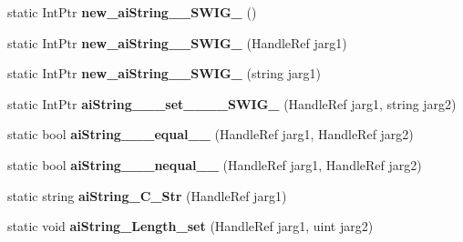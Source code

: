 \begin{DoxyCompactItemize}
\item 
\hypertarget{class_assimp_p_i_n_v_o_k_e_aaf47048d7ab228660b9896944cefd991}{static Int\+Ptr {\bfseries new\+\_\+ai\+String\+\_\+\+\_\+\+S\+W\+I\+G\+\_} ()}\label{class_assimp_p_i_n_v_o_k_e_aaf47048d7ab228660b9896944cefd991}

\item 
\hypertarget{class_assimp_p_i_n_v_o_k_e_a1bc609c6c57ff3c579df7ab551ebe539}{static Int\+Ptr {\bfseries new\+\_\+ai\+String\+\_\+\+\_\+\+S\+W\+I\+G\+\_} (Handle\+Ref jarg1)}\label{class_assimp_p_i_n_v_o_k_e_a1bc609c6c57ff3c579df7ab551ebe539}

\item 
\hypertarget{class_assimp_p_i_n_v_o_k_e_ae581f18f18d7af4663b7b8f8e7e3aa1d}{static Int\+Ptr {\bfseries new\+\_\+ai\+String\+\_\+\+\_\+\+S\+W\+I\+G\+\_} (string jarg1)}\label{class_assimp_p_i_n_v_o_k_e_ae581f18f18d7af4663b7b8f8e7e3aa1d}

\item 
\hypertarget{class_assimp_p_i_n_v_o_k_e_a064fca7198a4d0d456e51e63ef837e1a}{static Int\+Ptr {\bfseries ai\+String\+\_\+\+\_\+\+\_\+set\+\_\+\+\_\+\+\_\+\+\_\+\+S\+W\+I\+G\+\_} (Handle\+Ref jarg1, string jarg2)}\label{class_assimp_p_i_n_v_o_k_e_a064fca7198a4d0d456e51e63ef837e1a}

\item 
\hypertarget{class_assimp_p_i_n_v_o_k_e_a6b8aa2f7bba86767921c933182301877}{static bool {\bfseries ai\+String\+\_\+\+\_\+\+\_\+equal\+\_\+\+\_\+} (Handle\+Ref jarg1, Handle\+Ref jarg2)}\label{class_assimp_p_i_n_v_o_k_e_a6b8aa2f7bba86767921c933182301877}

\item 
\hypertarget{class_assimp_p_i_n_v_o_k_e_a6b71c239db4393f93a08557f294ef672}{static bool {\bfseries ai\+String\+\_\+\+\_\+\+\_\+nequal\+\_\+\+\_\+} (Handle\+Ref jarg1, Handle\+Ref jarg2)}\label{class_assimp_p_i_n_v_o_k_e_a6b71c239db4393f93a08557f294ef672}

\item 
\hypertarget{class_assimp_p_i_n_v_o_k_e_a944ac3f15dec039a0e54daa8d87952b3}{static string {\bfseries ai\+String\+\_\+\+C\+\_\+\+Str} (Handle\+Ref jarg1)}\label{class_assimp_p_i_n_v_o_k_e_a944ac3f15dec039a0e54daa8d87952b3}

\item 
\hypertarget{class_assimp_p_i_n_v_o_k_e_a8555eba1f9721745fb69a1e7758fe508}{static void {\bfseries ai\+String\+\_\+\+Length\+\_\+set} (Handle\+Ref jarg1, uint jarg2)}\label{class_assimp_p_i_n_v_o_k_e_a8555eba1f9721745fb69a1e7758fe508}


\end{DoxyCompactItemize}
